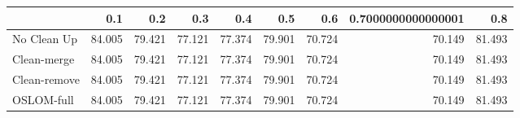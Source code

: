 \begin{tabular}{lrrrrrrrr}
\toprule
{} &    0.1 &    0.2 &    0.3 &    0.4 &    0.5 &    0.6 & 0.7000000000000001 &    0.8 \\
\midrule
No Clean Up  & 84.005 & 79.421 & 77.121 & 77.374 & 79.901 & 70.724 &             70.149 & 81.493 \\
Clean-merge  & 84.005 & 79.421 & 77.121 & 77.374 & 79.901 & 70.724 &             70.149 & 81.493 \\
Clean-remove & 84.005 & 79.421 & 77.121 & 77.374 & 79.901 & 70.724 &             70.149 & 81.493 \\
OSLOM-full   & 84.005 & 79.421 & 77.121 & 77.374 & 79.901 & 70.724 &             70.149 & 81.493 \\
\bottomrule
\end{tabular}
